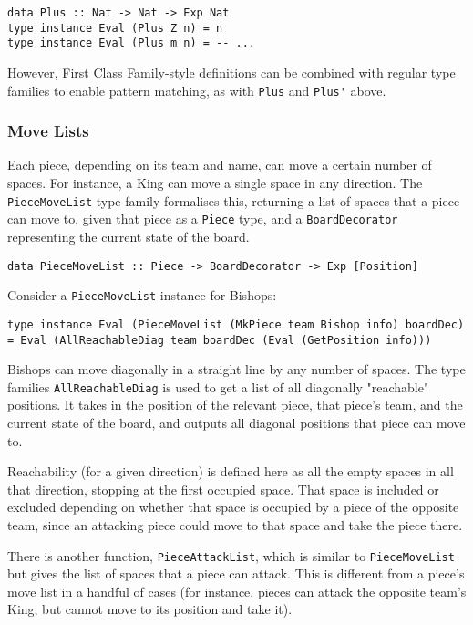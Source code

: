 \documentclass[12pt, a4paper, bibliography=totocnumbered]{scrartcl}
\begin{document}
\begin{lstlisting}
data Plus :: Nat -> Nat -> Exp Nat
type instance Eval (Plus Z n) = n
type instance Eval (Plus m n) = -- ...
\end{lstlisting}

However, First Class Family-style definitions can be combined with regular type families to enable pattern matching, as with \lstinline{Plus} and \lstinline{Plus'} above.

\subsubsection{Move Lists}

Each piece, depending on its team and name, can move a certain number of spaces. For instance, a King can move a single space in any direction. The \lstinline{PieceMoveList} type family formalises this, returning a list of spaces that a piece can move to, given that piece as a \lstinline{Piece} type, and a \lstinline{BoardDecorator} representing the current state of the board.

\begin{lstlisting}
data PieceMoveList :: Piece -> BoardDecorator -> Exp [Position]
\end{lstlisting}

Consider a \lstinline{PieceMoveList} instance for Bishops:

\begin{lstlisting}
type instance Eval (PieceMoveList (MkPiece team Bishop info) boardDec) = Eval (AllReachableDiag team boardDec (Eval (GetPosition info)))
\end{lstlisting}

Bishops can move diagonally in a straight line by any number of spaces. The type families \lstinline{AllReachableDiag} is used to get a list of all diagonally "reachable" positions. It takes in the position of the relevant piece, that piece's team, and the current state of the board, and outputs all diagonal positions that piece can move to.

Reachability (for a given direction) is defined here as all the empty spaces in all that direction, stopping at the first occupied space. That space is included or excluded depending on whether that space is occupied by a piece of the opposite team, since an attacking piece could move to that space and take the piece there.

There is another function, \lstinline{PieceAttackList}, which is similar to \lstinline{PieceMoveList} but gives the list of spaces that a piece can attack. This is different from a piece's move list in a handful of cases (for instance, pieces can attack the opposite team's King, but cannot move to its position and take it).
\end{document}
